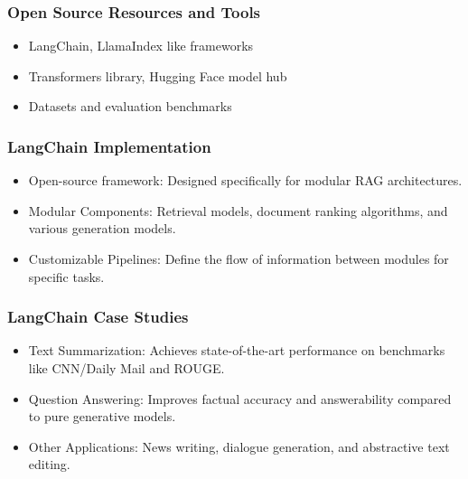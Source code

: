 \begin{frame}[fragile]\frametitle{Open Source Resources and Tools}

\begin{itemize}
\item LangChain, LlamaIndex like frameworks
\item Transformers library, Hugging Face model hub
\item Datasets and evaluation benchmarks
\end{itemize}	

\end{frame}



\begin{frame}[fragile]\frametitle{LangChain Implementation}

\begin{itemize}
\item Open-source framework: Designed specifically for modular RAG architectures.
\item Modular Components: Retrieval models, document ranking algorithms, and various generation models.
\item Customizable Pipelines: Define the flow of information between modules for specific tasks.
\end{itemize}	

\end{frame}

\begin{frame}[fragile]\frametitle{LangChain Case Studies}

\begin{itemize}
\item Text Summarization: Achieves state-of-the-art performance on benchmarks like CNN/Daily Mail and ROUGE.
\item Question Answering: Improves factual accuracy and answerability compared to pure generative models.
\item Other Applications: News writing, dialogue generation, and abstractive text editing.
\end{itemize}	

\end{frame}
